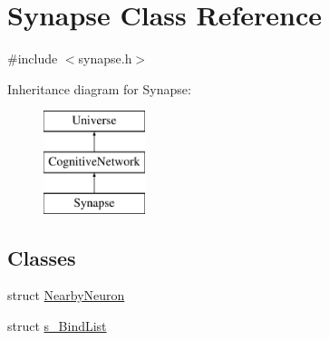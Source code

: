 \hypertarget{classSynapse}{}\section{Synapse Class Reference}
\label{classSynapse}


{\ttfamily \#include $<$synapse.\+h$>$}

Inheritance diagram for Synapse\+:\begin{figure}[H]
\begin{center}
\leavevmode
\includegraphics[height=3.000000cm]{classSynapse}
\end{center}
\end{figure}
\subsection*{Classes}
\begin{DoxyCompactItemize}
\item 
struct \mbox{\hyperlink{structSynapse_1_1NearbyNeuron}{Nearby\+Neuron}}
\item 
struct \mbox{\hyperlink{structSynapse_1_1s__BindList}{s\+\_\+\+Bind\+List}}
\end{DoxyCompactItemize}
